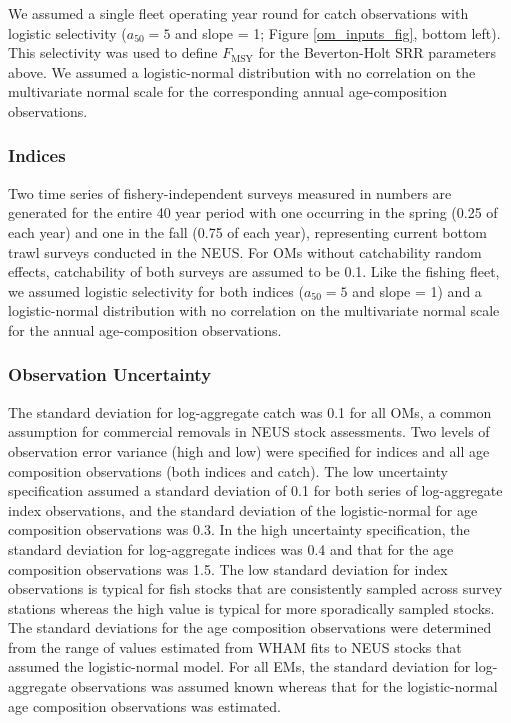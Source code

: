 \documentclass[
  12pt,
]{article}
\newcommand{\Fmsy}{\ensuremath{F_{\text{MSY}}}\xspace}
\begin{document}
We assumed a single fleet operating year round for catch observations
with logistic selectivity (\(a_{50} = 5\) and slope = 1; Figure
\ref{om_inputs_fig}, bottom left). This selectivity was used to define
\Fmsy for the Beverton-Holt SRR parameters above. We assumed a
logistic-normal distribution with no correlation on the multivariate
normal scale for the corresponding annual age-composition observations.

\subsubsection*{Indices}\label{indices}

Two time series of fishery-independent surveys measured in numbers are
generated for the entire 40 year period with one occurring in the spring
(0.25 of each year) and one in the fall (0.75 of each year),
representing current bottom trawl surveys conducted in the NEUS. For OMs
without catchability random effects, catchability of both surveys are
assumed to be 0.1. Like the fishing fleet, we assumed logistic
selectivity for both indices (\(a_{50} = 5\) and slope = 1) and a
logistic-normal distribution with no correlation on the multivariate
normal scale for the annual age-composition observations.

\subsubsection*{Observation Uncertainty}\label{observation-uncertainty}

The standard deviation for log-aggregate catch was 0.1 for all OMs, a
common assumption for commercial removals in NEUS stock assessments. Two
levels of observation error variance (high and low) were specified for
indices and all age composition observations (both indices and catch).
The low uncertainty specification assumed a standard deviation of 0.1
for both series of log-aggregate index observations, and the standard
deviation of the logistic-normal for age composition observations was
0.3. In the high uncertainty specification, the standard deviation for
log-aggregate indices was 0.4 and that for the age composition
observations was 1.5. The low standard deviation for index observations
is typical for fish stocks that are consistently sampled across survey
stations whereas the high value is typical for more sporadically sampled
stocks. The standard deviations for the age composition observations
were determined from the range of values estimated from WHAM fits to
NEUS stocks that assumed the logistic-normal model. For all EMs, the
standard deviation for log-aggregate observations was assumed known
whereas that for the logistic-normal age composition observations was
estimated.
\end{document}
